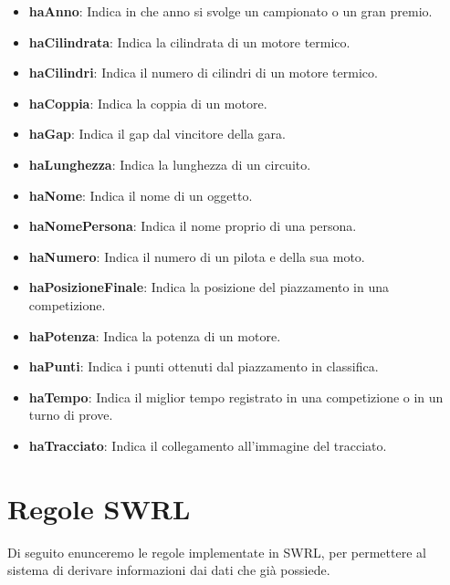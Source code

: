\begin{itemize}
\item \textbf{haAnno}: Indica in che anno si svolge un campionato o un gran premio.
\item \textbf{haCilindrata}: Indica la cilindrata di un motore termico.
\item \textbf{haCilindri}: Indica il numero di cilindri di un motore termico.
\item \textbf{haCoppia}: Indica la coppia di un motore.
\item \textbf{haGap}: Indica il gap dal vincitore della gara.
\item \textbf{haLunghezza}: Indica la lunghezza di un circuito.
\item \textbf{haNome}: Indica il nome di un oggetto.
\item \textbf{haNomePersona}: Indica il nome proprio di una persona.
\item \textbf{haNumero}: Indica il numero di un pilota e della sua moto.
\item \textbf{haPosizioneFinale}: Indica la posizione del piazzamento in una competizione.
\item \textbf{haPotenza}: Indica la potenza di un motore.
\item \textbf{haPunti}: Indica i punti ottenuti dal piazzamento in classifica.
\item \textbf{haTempo}: Indica il miglior tempo registrato in una competizione o in un turno di prove.
\item \textbf{haTracciato}: Indica il collegamento all'immagine del tracciato.
\end{itemize}

\section{Regole SWRL}

Di seguito enunceremo le regole implementate in SWRL, per permettere al sistema di derivare informazioni dai dati che già possiede.

